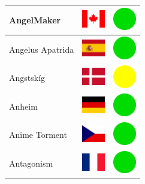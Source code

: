 \documentclass[12pt, a4paper, twoside]{report}
\begin{document}
\begin{center}
\begin{longtable}{|p{5cm}|p{2cm}|p{2cm}|}
 AngelMaker                                                 & \includegraphics[width=1cm]{../img/flags/ca} &   \includegraphics[width=1cm]{../likes/y} \\ \hline
 Angelus Apatrida                                           & \includegraphics[width=1cm]{../img/flags/es} &   \includegraphics[width=1cm]{../likes/y} \\ \hline
 Angstskíg                                                  & \includegraphics[width=1cm]{../img/flags/dk} &   \includegraphics[width=1cm]{../likes/m} \\ \hline
 Anheim                                                     & \includegraphics[width=1cm]{../img/flags/de} &   \includegraphics[width=1cm]{../likes/y} \\ \hline
 Anime Torment                                              & \includegraphics[width=1cm]{../img/flags/cz} &   \includegraphics[width=1cm]{../likes/y} \\ \hline
 Antagonism                                                 & \includegraphics[width=1cm]{../img/flags/fr} &   \includegraphics[width=1cm]{../likes/y} \\ \hline

\end{longtable}
\end{center}
\end{document}
